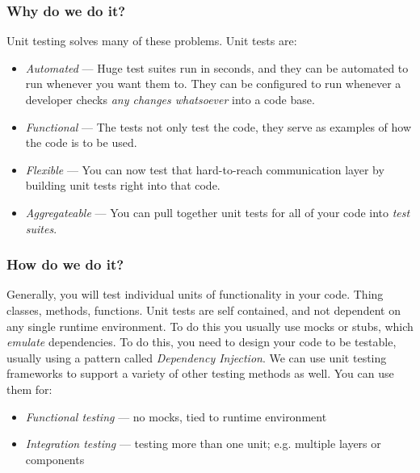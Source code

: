 \documentclass[t, 10pt]{beamer}
\begin{document}
\begin{frame}
\frametitle{Why do we do it?}
Unit testing solves many of these problems.  Unit tests are:
\begin{itemize}
\item \textit{Automated} --- Huge test suites run in seconds, and they can be automated to run whenever you want them to.  They can be configured to run whenever a developer checks \textit{any changes whatsoever} into a code base.
\item \textit{Functional} --- The tests not only test the code, they serve as examples of how the code is to be used.
\item \textit{Flexible} --- You can now test that hard-to-reach communication layer by building unit tests right into that code.
\item \textit{Aggregateable} --- You can pull together unit tests for all of your code into \textit{test suites}.
\end{itemize}
\end{frame}

\begin{frame}
\frametitle{How do we do it?}
Generally, you will test individual units of functionality in your code.  Thing classes, methods, functions.  Unit tests are self contained, and not dependent on any single runtime environment.  To do this you usually use mocks or stubs, which \textit{emulate} dependencies.  To do this, you need to design your code to be testable, usually using a pattern called \textit{Dependency Injection}.
\newline
\newline
We can use unit testing frameworks to support a variety of other testing methods as well.  You can use them for:
\begin{itemize}
\item \textit{Functional testing} --- no mocks, tied to runtime environment
\item \textit{Integration testing} --- testing more than one unit; e.g. multiple layers or components
\end{itemize}
\end{frame}
\end{document}
